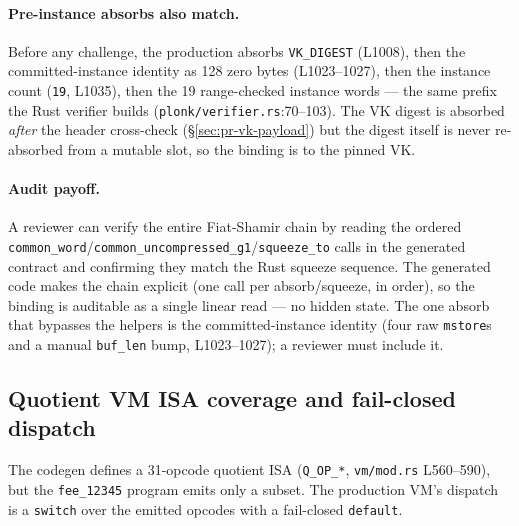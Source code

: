 \paragraph{Pre-instance absorbs also match.} Before any challenge,
the production absorbs \texttt{VK\_DIGEST} (L1008), then the
committed-instance identity as 128 zero bytes (L1023--1027), then the
instance count (\texttt{19}, L1035), then the 19 range-checked instance
words --- the same prefix the Rust verifier builds
(\texttt{plonk/verifier.rs}:70--103). The VK digest is absorbed \emph{after} the
header cross-check (\S\ref{sec:pr-vk-payload}) but the digest itself
is never re-absorbed from a mutable slot, so the binding is to the
pinned VK.

\paragraph{Audit payoff.} A reviewer can verify the entire
Fiat-Shamir chain by reading the ordered
\texttt{common\_word}/\texttt{common\_\allowbreak{}uncompressed\_\allowbreak{}g1}/\texttt{squeeze\_to}
calls in the generated contract and confirming they match the Rust
squeeze sequence. The generated code makes the chain explicit (one
call per absorb/squeeze, in order), so the binding is auditable as a
single linear read --- no hidden state. The one absorb that bypasses the
helpers is the committed-instance identity (four raw \texttt{mstore}s and
a manual \texttt{buf\_len} bump, L1023--1027); a reviewer must include it.

\subsection{Quotient VM ISA coverage and fail-closed dispatch}
\label{sec:pr-vm-isa}

The codegen defines a 31-opcode quotient ISA (\texttt{Q\_OP\_*},
\texttt{vm/mod.rs} L560--590), but the \texttt{fee\_12345} program
emits only a subset. The production VM's dispatch is a
\texttt{switch} over the emitted opcodes with a fail-closed
\texttt{default}.

